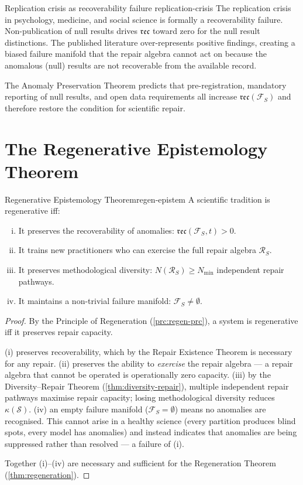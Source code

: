 \documentclass[12pt,twoside,openright]{book}
\newcommand{\reco}{\mathfrak{rec}}
\newcounter{exercise}[chapter]
\begin{document}
\begin{remark}{Replication crisis as recoverability failure}%
  {replication-crisis}
  The replication crisis in psychology, medicine, and
  social science is formally a recoverability failure.
  Non-publication of null results drives $\reco$
  toward zero for the null result distinctions. The
  published literature over-represents positive
  findings, creating a biased failure manifold that
  the repair algebra cannot act on because the
  anomalous (null) results are not recoverable from
  the available record.

  The Anomaly Preservation Theorem predicts that
  pre-registration, mandatory reporting of null results,
  and open data requirements all increase
  $\reco(\mathcal{F}_S)$ and therefore restore the
  condition for scientific repair.
\end{remark}

\section{The Regenerative Epistemology Theorem}

\begin{theorem}{Regenerative Epistemology Theorem}{regen-epistem}
  A scientific tradition is regenerative iff:
  \begin{enumerate}[(i)]
    \item It preserves the recoverability of anomalies:
          $\reco(\mathcal{F}_S, t) > 0$.
    \item It trains new practitioners who can exercise
          the full repair algebra $\mathcal{R}_S$.
    \item It preserves methodological diversity:
          $N(\mathcal{R}_S) \ge N_{\min}$ independent
          repair pathways.
    \item It maintains a non-trivial failure manifold:
          $\mathcal{F}_S \ne \emptyset$.
  \end{enumerate}
\end{theorem}

\begin{proof}
  By the Principle of Regeneration
  (\cref{prc:regen-prc}), a system is regenerative
  iff it preserves repair capacity.

  (i) preserves recoverability, which by the Repair
  Existence Theorem is necessary for any repair.
  (ii) preserves the ability to \emph{exercise} the
  repair algebra — a repair algebra that cannot be
  operated is operationally zero capacity.
  (iii) by the Diversity--Repair Theorem
  (\cref{thm:diversity-repair}), multiple independent
  repair pathways maximise repair capacity; losing
  methodological diversity reduces $\kappa(\mathcal{S})$.
  (iv) an empty failure manifold ($\mathcal{F}_S = \emptyset$)
  means no anomalies are recognised. This cannot arise
  in a healthy science (every partition produces blind
  spots, every model has anomalies) and instead
  indicates that anomalies are being suppressed rather
  than resolved — a failure of (i).

  Together (i)--(iv) are necessary and sufficient for
  the Regeneration Theorem (\cref{thm:regeneration}).
\end{proof}
\end{document}
